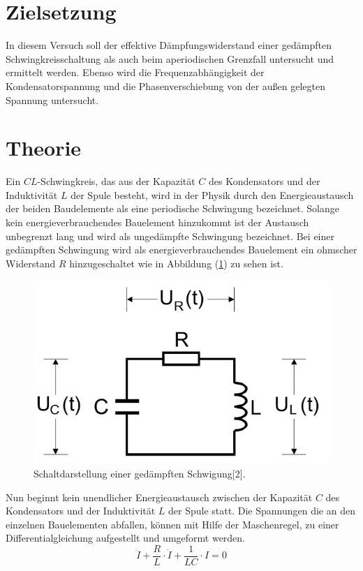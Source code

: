 \section{Zielsetzung}
In diesem Versuch soll der effektive Dämpfungswiderstand
einer gedämpften Schwingkreisschaltung als auch beim aperiodischen Grenzfall
untersucht und ermittelt werden. Ebenso wird die Frequenzabhängigkeit
der Kondensatorspannung und die Phasenverschiebung von der außen gelegten Spannung
untersucht.
\section{Theorie}
Ein $CL$-Schwingkreis, das aus der Kapazität $C$ des Kondensators und der
Induktivität $L$ der Spule besteht, wird in der Physik durch den
Energieaustausch der beiden Baudelemente als eine periodische Schwingung bezeichnet.
Solange kein energieverbrauchendes Bauelement hinzukommt ist der Austausch unbegrenzt lang
und wird als ungedämpfte Schwingung bezeichnet.
Bei einer gedämpften Schwingung wird als energieverbrauchendes Bauelement ein ohmscher Widerstand $R$
hinzugeschaltet wie in Abbildung (\ref{fig:1}) zu sehen ist.
\begin{figure}[H]
\centering
\includegraphics[width=10 cm , height=7 cm]{Schwingkreis.png}
\caption{Schaltdarstellung einer gedämpften Schwigung[2].}
\label{fig:1}
\end{figure}
Nun beginnt kein unendlicher Energieaustausch zwischen der Kapazität $C$
des Kondensators und der Induktivität $L$ der Spule statt.
Die Spannungen die an den einzelnen Bauelementen abfallen,
können mit Hilfe der Maschenregel, zu einer Differentialgleichung aufgestellt und umgeformt werden.
\begin{equation}
  \ddot{I} + \frac{R}{L} \cdot \dot{I} +\frac{1}{LC}\cdot I = 0
  \label{eq:1}
\end{equation}
